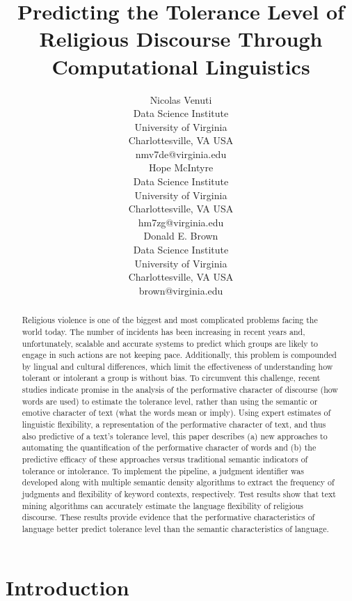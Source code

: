 \documentclass[11pt]{article}
\title{Predicting the Tolerance Level of Religious Discourse Through Computational Linguistics}
\author{Nicolas Venuti \\
  Data Science Institute \\
  University of Virginia \\
  Charlottesville, VA USA \\
  {nmv7de@virginia.edu} \\\And
  Hope McIntyre \\
  Data Science Institute \\
  University of Virginia \\
  Charlottesville, VA USA \\
  {hm7zg@virginia.edu}\\\And
  Donald E. Brown \\
  Data Science Institute \\
  University of Virginia \\
  Charlottesville, VA USA \\
  {brown@virginia.edu} \\}
\date{}
\begin{document}
\maketitle
\begin{abstract}
 Religious violence is one of the biggest and most complicated problems facing the world today. The number of incidents has been increasing in recent years and, unfortunately, scalable and accurate systems to predict which groups are likely to engage in such actions are not keeping pace. Additionally, this problem is compounded by lingual and cultural differences, which limit the effectiveness of understanding how tolerant or intolerant a group is without bias. To circumvent this challenge, recent studies indicate promise in the analysis of the performative character of discourse (how words are used) to estimate the tolerance level, rather than using the semantic or emotive character of text (what the words mean or imply). Using expert estimates of linguistic flexibility, a representation of the performative character of text, and thus also predictive of a text’s tolerance level, this paper describes (a) new approaches to automating the quantification of the performative character of words and (b) the predictive efficacy of these approaches versus traditional semantic indicators of tolerance or intolerance. To implement the pipeline, a judgment identifier was developed along with multiple semantic density algorithms to extract the frequency of judgments and flexibility of keyword contexts, respectively. Test results show that text mining algorithms can accurately estimate the language flexibility of religious discourse. These results provide evidence that the performative characteristics of language better predict tolerance level than the semantic characteristics of language.

\end{abstract}

\section{Introduction}\label{Intro}

\end{document}
